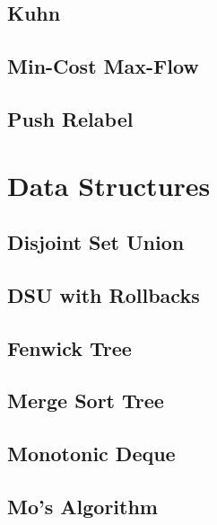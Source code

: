 \subsection{Kuhn}
\raggedbottom
\hrulefill
\subsection{Min-Cost Max-Flow}
\raggedbottom
\hrulefill
\subsection{Push Relabel}
\raggedbottom
\hrulefill

\section{Data Structures}
\subsection{Disjoint Set Union}
\raggedbottom
\hrulefill
\subsection{DSU with Rollbacks}
\raggedbottom
\hrulefill
\subsection{Fenwick Tree}
\raggedbottom
\hrulefill
\subsection{Merge Sort Tree}
\raggedbottom
\hrulefill
\subsection{Monotonic Deque}
\raggedbottom
\hrulefill
\subsection{Mo's Algorithm}
\raggedbottom
\hrulefill
